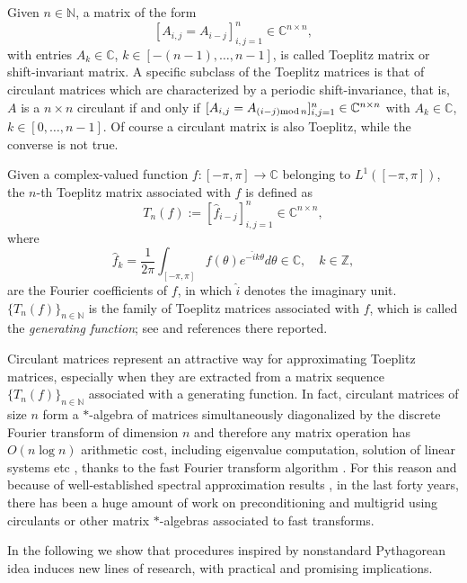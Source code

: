 \documentclass{article}
\begin{document}
{Given ${n} \in \mathbb{N}$, a matrix of the form
\[
[A_{i,j}=A_{{i}-{j}}]_{{i},{j}=1}^{{n}} \in \mathbb{C}^{{n} \times {n}},
\]
with entries $A_{{k}} \in \mathbb{C}$, ${k} \in [-({n-1}), \dots, {n-1}]$, is called Toeplitz matrix or shift-invariant matrix.
A specific subclass of the Toeplitz matrices is that of circulant matrices which are characterized by a periodic shift-invariance, that is, $A$ is a $n\times n$ circulant if and only if $[A_{i,j}=A_{({i}-{j}){\rm mod}\, n}]_{{i},{j}=1}^{{n}} \in \mathbb{C}^{{n} \times {n}}$ with $A_{{k}} \in \mathbb{C}$, ${k} \in [0, \dots, {n-1}]$. Of course a circulant matrix is also Toeplitz, while the converse is not true.

Given a complex-valued function $f : [-\pi, \pi] \to \mathbb{C}$ belonging to $L^1([-\pi, \pi])$, the ${n}$-th Toeplitz matrix associated with $f$ is defined as
\[
T_{{n}}(f) := [\hat{f}_{{i-j}}]_{{i,j=1}}^{{n}} \in \mathbb{C}^{{n} \times {n}},
\]
where
\[
\hat{f}_{{k}} = \frac{1}{2\pi} \int_{[-\pi,\pi]} f({\theta}) e^{-\hat i{k}\theta} d {\theta} \in \mathbb{C}, \quad {k} \in \mathbb{Z},
\]
are the Fourier coefficients of $f$, in which $\hat i$ denotes the imaginary unit.
$\{T_{{n}}(f)\}_{{n} \in \mathbb{N}}$ is the family of Toeplitz matrices associated with $f$, which is called the \textit{generating function}; see \cite[Chapter 6]{GLT-bookI} and references there reported.}

Circulant matrices represent an attractive way for approximating Toeplitz matrices, especially when they are extracted from a matrix sequence $\{T_{{n}}(f)\}_{{n} \in \mathbb{N}}$ associated with a generating function. In fact, circulant matrices of size $n$ form a $*$-algebra of matrices simultaneously diagonalized by the discrete Fourier transform of dimension $n$ and therefore any matrix operation has $O(n\log n)$ arithmetic cost, including eigenvalue computation, solution of linear systems etc \cite{Ng_book}, thanks to the fast Fourier transform algorithm \cite{Van_Loan}. For this reason and because of well-established spectral approximation results \cite{GLT-bookI,Ng_book}, in the last forty years, there has been a huge amount of work on preconditioning and multigrid using circulants or other matrix $*$-algebras associated to fast transforms.

In the following we show that procedures inspired by nonstandard Pythagorean idea induces new lines of research, with practical and promising implications.
\end{document}
